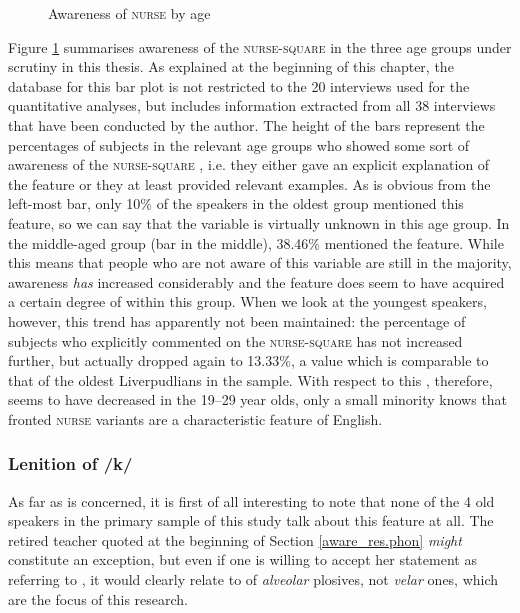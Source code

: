 \begin{figure}[h]
	\centering
		\resizebox{.49\linewidth}{!}{} 
	\caption{Awareness of \textsc{nurse} by age}
	\label{fig.aware.nurse}
\end{figure}

Figure \ref{fig.aware.nurse} summarises awareness of the \textsc{nurse}-\textsc{square}  in the three age groups under scrutiny in this thesis.
As explained at the beginning of this chapter, the database for this bar plot is not restricted to the 20 interviews used for the quantitative analyses, but includes information extracted from all 38 interviews that have been conducted by the author.
The height of the bars represent the percentages of subjects in the relevant age groups who showed some sort of  awareness of the \textsc{nurse}-\textsc{square} , i.e. they either gave an explicit explanation of the feature or they at least provided relevant examples.
As is obvious from the left-most bar, only 10\% of the speakers in the oldest group mentioned this feature, so we can say that the variable is virtually unknown in this age group.
In the middle-aged group (bar in the middle), 38.46\% mentioned the feature.
While this means that people who are not  aware of this variable are still in the majority, awareness \emph{has} increased considerably and the feature does seem to have acquired a certain degree of  within this group.
When we look at the youngest speakers, however, this trend has apparently not been maintained: the percentage of subjects who explicitly commented on the \textsc{nurse}-\textsc{square}  has not increased further, but actually dropped again to 13.33\%, a value which is comparable to that of the oldest Liverpudlians in the sample.
With respect to this , therefore,  seems to have decreased in the 19--29 year olds, only a small minority knows that fronted \textsc{nurse} variants are a characteristic feature of  English.

\subsubsection{Lenition of /k/}
\label{aware_res.phon.k}

As far as  is concerned, it is first of all interesting to note that none of the 4 old speakers in the primary sample of this study talk about this feature at all.
The retired teacher quoted at the beginning of Section \ref{aware_res.phon} \emph{might} constitute an exception, but even if one is willing to accept her statement as referring to , it would clearly relate to  of \emph{alveolar} plosives, not \emph{velar} ones, which are the focus of this research.

